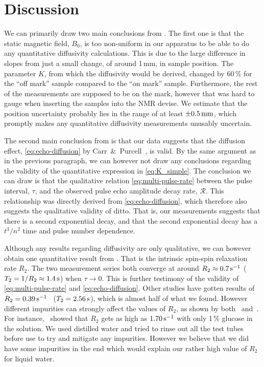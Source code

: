 \documentclass[11pt,a4paper, twocolumn,
swedish, english %
]{article}
\begin{document}
\section{Discussion}

We can primarily draw two main conclusions from
. The first one is that the static magnetic 
field, $B_0$, is too non-uniform in our apparatus to be able to do any
quantitative diffusivity calculations. This is due to the large
difference in slopes from just a small change, of around 1\,mm, in
sample position. The parameter $K$, from which the diffusivity would
be derived, changed by 60\,\% for the ``off mark'' sample compared to
the ``on mark'' sample. Furthermore, the rest of the measurements are
supposed to be on the mark, however that was hard to gauge when
inserting the samples into the NMR devise. We estimate that the
position uncertainty probably lies in the range of at least
$\pm\unit[0.5]{mm}$, which promptly makes any quantitative diffusivity
measurements unusably uncertain. 

The second main conclusion from  is that our
data suggests that the diffusion effect, \eqref{eq:echo-diffusion} by
Carr~\&~Purcell~\cite{Carr-Purcell1954}, is valid. By the same
argument as in the previous paragraph, we can however not draw any
conclusions regarding the validity of the quantitative expression in
\eqref{eq:K_simple}. The conclusion we can draw is that the
qualitative relation \eqref{eq:multi-pulse-rate} between the pulse
interval, $\tau$, and the observed pulse echo amplitude decay rate,
$\mathcal{R}$. This relationship was directly derived from
\eqref{eq:echo-diffusion}, which therefore also suggests the
qualitative validity of ditto. That is, our measurements suggests that
there is a second exponential decay, and that the second exponential
decay has a $t^3/n^2$ time and pulse number dependence. 

Although any results regarding diffusivity are only
qualitative, we can however obtain one quantitative result from
. That is the intrinsic spin-spin relaxation
rate $R_2$. The two measurement series both converge at around
$R_2\approx\unit[0.7]{s^{-1}}$ ($T_2=1/R_2\approx\unit[1.4]{s}$) when
$\tau\to0$. This is further testimony 
of the validity of \eqref{eq:multi-pulse-rate} and
\eqref{eq:echo-diffusion}. Other studies have gotten results of
$R_2=\unit[0.39]{s^{-1}}$~\cite{Sabadini-etal2008}
($T_2=\unit[2.56]{s}$), which is almost half of what we
found. However different impurities can strongly affect the values of
$R_2$, as shown by both~\cite{Sabadini-etal2008}
and~\cite{Ono-etal2004}. For instance,~\cite{Sabadini-etal2008}
showed that $R_2$ gets as high as $\unit[1.70]{s^{-1}}$ with only
1\,\% glucose in the solution. We used distilled water and tried to
rinse out all the test tubes before use to try and mitigate any
impurities. However we believe that we did have some impurities in
the end which would explain our rather high value of $R_2$ for liquid
water.  
\end{document}
